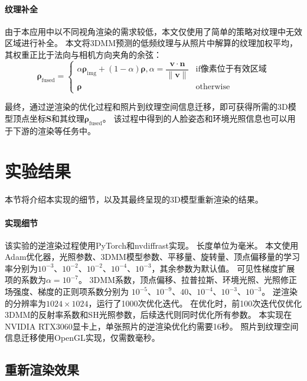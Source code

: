 \paragraph{纹理补全}
由于本应用中以不同视角渲染的需求较低，本文仅使用了简单的策略对纹理中无效区域进行补全。
本文将3DMM预测的低频纹理与从照片中解算的纹理加权平均，其权重正比于法向与相机方向夹角的余弦：
\begin{equation}
\mathbf{\rho}_\mathrm{fused} = \begin{cases}
    \alpha \mathbf{\rho}_\mathrm{img} + (1-\alpha) \mathbf{\rho}, \alpha = \dfrac{\mathbf{v}\cdot\mathbf{n}}{\|\mathbf{v}\|} & \text{if像素位于有效区域} \\
\mathbf{\rho} & \text{otherwise}
\end{cases}
\label{eq:texture_fusion}
\end{equation}

最终，通过逆渲染的优化过程和照片到纹理空间信息迁移，即可获得所需的3D模型顶点坐标$\mathbf{S}$和其纹理$\mathbf{\rho}_\mathrm{fused}$。
该过程中得到的人脸姿态和环境光照信息也可以用于下游的渲染等任务中。

\section{实验结果}

本节将介绍本实现的细节，以及其最终呈现的3D模型重新渲染的结果。

\paragraph{实现细节}
该实验的逆渲染过程使用PyTorch\citep{pytorch}和nvdiffrast实现。
长度单位为毫米。
本文使用Adam\citep{adam}优化器，光照参数、3DMM模型参数、平移量、旋转量、顶点偏移量的学习率分别为$10^{-3}$、$10^{-2}$、$10^{-2}$、$10^{-4}$、$10^{-3}$，其余参数为默认值。
可见性梯度扩展项的系数为$\alpha=10^{-7}$。
3DMM系数，顶点偏移、拉普拉斯、环境光照、光照修正场强度、梯度的正则项系数分别为
$10^{-5}$、$10^{-9}$、$40$、$10^{-4}$、$10^{-3}$、$10^{-3}$。
逆渲染的分辨率为$1024\times1024$，运行了1000次优化迭代。
在优化时，前100次迭代仅优化3DMM的反射率系数和SH光照参数，后续迭代则同时优化所有参数。
本实现在NVIDIA RTX3060显卡上，单张照片的逆渲染优化约需要16秒。
照片到纹理空间信息迁移使用OpenGL实现，仅需数毫秒。

\subsection{重新渲染效果}

